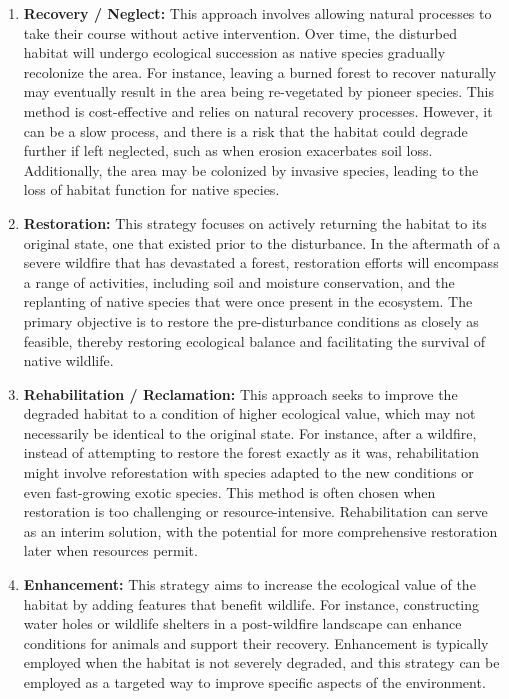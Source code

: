 \documentclass[
  12 pt,
]{Nemilov}
\begin{document}
\begin{enumerate}
\def\labelenumi{\arabic{enumi}.}
\item
  \textbf{Recovery / Neglect:} This approach involves allowing natural processes to take their course without active intervention. Over time, the disturbed habitat will undergo ecological succession as native species gradually recolonize the area. For instance, leaving a burned forest to recover naturally may eventually result in the area being re-vegetated by pioneer species. This method is cost-effective and relies on natural recovery processes. However, it can be a slow process, and there is a risk that the habitat could degrade further if left neglected, such as when erosion exacerbates soil loss. Additionally, the area may be colonized by invasive species, leading to the loss of habitat function for native species.
\item
  \textbf{Restoration:} This strategy focuses on actively returning the habitat to its original state, one that existed prior to the disturbance. In the aftermath of a severe wildfire that has devastated a forest, restoration efforts will encompass a range of activities, including soil and moisture conservation, and the replanting of native species that were once present in the ecosystem. The primary objective is to restore the pre-disturbance conditions as closely as feasible, thereby restoring ecological balance and facilitating the survival of native wildlife.
\item
  \textbf{Rehabilitation / Reclamation:} This approach seeks to improve the degraded habitat to a condition of higher ecological value, which may not necessarily be identical to the original state. For instance, after a wildfire, instead of attempting to restore the forest exactly as it was, rehabilitation might involve reforestation with species adapted to the new conditions or even fast-growing exotic species. This method is often chosen when restoration is too challenging or resource-intensive. Rehabilitation can serve as an interim solution, with the potential for more comprehensive restoration later when resources permit.
\item
  \textbf{Enhancement:} This strategy aims to increase the ecological value of the habitat by adding features that benefit wildlife. For instance, constructing water holes or wildlife shelters in a post-wildfire landscape can enhance conditions for animals and support their recovery. Enhancement is typically employed when the habitat is not severely degraded, and this strategy can be employed as a targeted way to improve specific aspects of the environment.

\end{enumerate}
\end{document}
